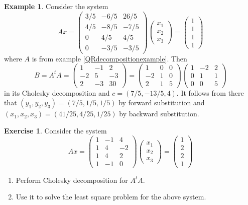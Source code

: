 \documentclass[12pt]{amsart}
\theoremstyle{definition}
\newtheorem{example}[theorem]{Example}
\newtheorem{exercise}[theorem]{Exercise}
\begin{document}
\begin{example}\label{leastsquareproblemCholeskydecompositionexample} Consider the system
$$Ax = \left(\begin{array}{ccc} 3/5 & -6/5 & 26/5 \\ 4/5 & -8/5 & -7/5 \\ 0 & 4/5 & 4/5 \\ 0 & -3/5 & -3/5 \end{array} \right)\left(\begin{array}{c} x_1 \\ x_2 \\ x_3 \end{array}\right) = \left(\begin{array}{c}1 \\ 1 \\ 1 \\ 1\end{array}\right)$$
where $A$ is from example \ref{QRdecompositionexample}. Then
$$B = A^tA = \left(\begin{array}{ccc} 1 & -1 & 2 \\ -2 & 5 & -3 \\ 2 & -3 & 30 \end{array}\right) = \left(\begin{array}{ccc} 1 & 0 & 0 \\ -2 & 1 & 0 \\ 2 & 1 & 5 \end{array}\right)\left(\begin{array}{ccc} 1 & -2 & 2 \\ 0 & 1 & 1 \\ 0 & 0 & 5 \end{array}\right)$$
in its Cholesky decomposition and $c = (7/5, -13/5, 4)$. It follows from there that $(y_1, y_2, y_3) = (7/5, 1/5, 1/5)$ by forward substitution and $(x_1, x_2, x_3) = (41/25, 4/25, 1/25)$ by backward substitution.
\end{example}

\begin{exercise}\label{leastsquareproblemCholeskydecompositionexercise} Consider the system
$$Ax = \left(\begin{array}{ccc} 1 & -1 & 4 \\ 1 & 4 & -2 \\ 1 & 4 & 2 \\ 1 & -1 & 0 \end{array}\right)\left(\begin{array}{c} x_1 \\ x_2 \\ x_3 \end{array}\right) = \left(\begin{array}{c}1 \\ 2 \\ 2 \\ 1\end{array}\right)$$
\begin{enumerate}[\indent a.]
\item Perform Cholesky decomposition for $A^tA$.
\item Use it to solve the least square problem for the above system.
\end{enumerate}
\end{exercise}
\end{document}
